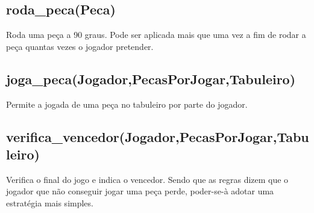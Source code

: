\documentclass[a4paper]{article}
\begin{document}
\subsection{roda\_peca(Peca)}

Roda uma peça a 90 graus. Pode ser aplicada mais que uma vez a fim de rodar a peça quantas vezes o jogador pretender.

\subsection{joga\_peca(Jogador,PecasPorJogar,Tabuleiro)}

Permite a jogada de uma peça no tabuleiro por parte do jogador.

\subsection{verifica\_vencedor(Jogador,PecasPorJogar,Tabuleiro)}
Verifica o final do jogo e indica o vencedor. Sendo que as regras dizem que o jogador que não conseguir jogar uma peça perde, poder-se-à adotar uma estratégia mais simples.
\end{document}
